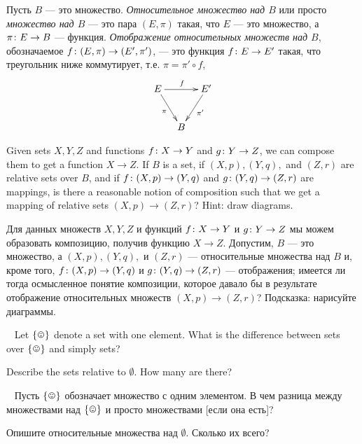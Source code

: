 \documentclass[CT4S-EN-RU]{subfiles}
\begin{document}
\begin{definitionRUS}\label{def:relative sets}
Пусть $B$ — это множество. {\em Относительное множество над $B$} или просто {\em множество над $B$} — это пара $(E,\pi)$ такая, что $E$ — это множество, а $\pi\colon E\rightarrow B$ — функция. {\em Отображение относительных множеств над $B$}, обозначаемое $f\colon (E,\pi)\rightarrow(E',\pi')$, — это функция $f\colon E\rightarrow E'$ такая, что треугольник ниже коммутирует, т.е. $\pi=\pi'\circ f$,
$$
\xymatrix@=10pt{E\ar[rr]^f\ar[rdd]_{\pi}&&E'\ar[ldd]^{\pi'}\\\\&B
}
$$
\end{definitionRUS}

\begin{exerciseENG}
Given sets $X,Y,Z$ and functions $f\colon X\rightarrow Y$ and $g\colon Y\rightarrow Z$, we can compose them to get a function $X\to Z$. If $B$ is a set, if $(X,p), (Y,q),$ and $(Z,r)$ are relative sets over $B$, and if $f\colon (X,p)\rightarrow (Y,q)$ and $g\colon (Y,q)\rightarrow (Z,r)$ are mappings, is there a reasonable notion of composition such that we get a mapping of relative sets $(X,p)\to (Z,r)$? Hint: draw diagrams.
\end{exerciseENG}

\begin{exerciseRUS}
Для данных множеств $X,Y,Z$ и функций $f\colon X\rightarrow Y$ и $g\colon Y\rightarrow Z$ мы можем образовать композицию, получив функцию $X\to Z$. Допустим, $B$ — это множество, а $(X,p), (Y,q),$ и $(Z,r)$ — относительные множества над $B$ и, кроме того, $f\colon (X,p)\rightarrow (Y,q)$ и $g\colon (Y,q)\rightarrow (Z,r)$ — отображения; имеется ли тогда осмысленное понятие композиции, которое давало бы в результате отображение относительных множеств $(X,p)\to (Z,r)$? Подсказка: нарисуйте диаграммы.
\end{exerciseRUS}

\begin{exerciseENG}~
\sexc Let $\singleton$ denote a set with one element. What is the difference between sets over $\singleton$ and simply sets?
\item Describe the sets relative to $\emptyset$. How many are there?
\endsexc
\end{exerciseENG}

\begin{exerciseRUS}~
\sexc Пусть $\singleton$ обозначает множество с одним элементом. В чем разница между множествами над $\singleton$ и просто множествами [если она есть]?
\item Опишите относительные множества над $\emptyset$. Сколько их всего?
\endsexc
\end{exerciseRUS}
\end{document}
